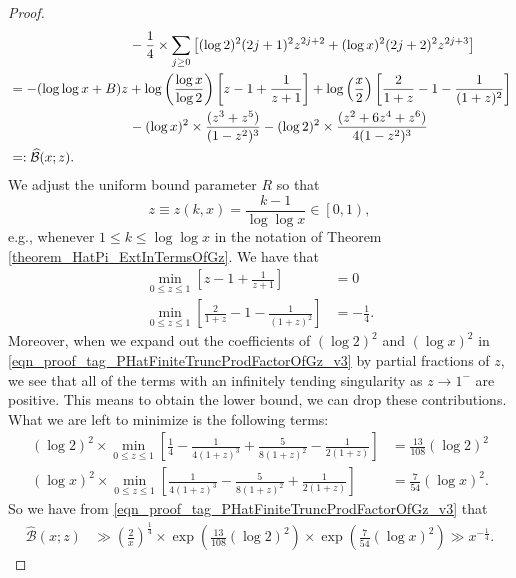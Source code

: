 \documentclass[11pt,reqno,a4letter]{article}
\numberwithin{figure}{section}
\numberwithin{table}{section}
\theoremstyle{plain}
\numberwithin{theorem}{section}
\theoremstyle{definition}
\begin{document}
\begin{proof}
\begin{align}
\notag 
     & \phantom{= -(B + \log\log x) z\ } - 
     \frac{1}{4} \times \sum_{j \geq 0} \left[ 
     (\log 2)^2 (2j+1)^2 z^{2j+2} + (\log x)^2 (2j+2)^2 z^{2j+3} 
     \right] \\ 
\notag 
     & = -(\log\log x + B) z + 
     \log\left(\frac{\log x}{\log 2}\right) \left[ 
     z - 1 + \frac{1}{z+1}\right] + 
     \log\left(\frac{x}{2}\right)\left[ 
     \frac{2}{1+z} - 1 - \frac{1}{(1+z)^2}\right] \\ 
\notag 
     & \phantom{= -(B + \log\log x) z\ } - 
     (\log x)^2 \times \frac{(z^3+z^5)}{(1-z^2)^3} - 
     (\log 2)^2 \times \frac{(z^2+6z^4+z^6)}{4 (1-z^2)^3} \\ 
\label{eqn_proof_tag_PHatFiniteTruncProdFactorOfGz_v3} 
     & =: \widehat{\mathcal{B}}(x; z). 
\end{align} 
We adjust the uniform bound parameter $R$ so that 
$$z \equiv z(k, x) = \frac{k-1}{\log\log x} \in \left[0, 1\right),$$ 
e.g., whenever $1 \leq k \leq \log\log x$ 
in the notation of Theorem \ref{theorem_HatPi_ExtInTermsOfGz}. 
We have that 
\begin{align*} 
\min_{0 \leq z \leq 1} \left[z - 1 + \frac{1}{z+1}\right] & = 0 \\ 
\min_{0 \leq z \leq 1} \left[\frac{2}{1+z} - 1 - \frac{1}{(1+z)^2}\right] & = -\frac{1}{4}. 
\end{align*} 
Moreover, when we expand out the coefficients of 
$(\log 2)^2$ and $(\log x)^2$ in 
\eqref{eqn_proof_tag_PHatFiniteTruncProdFactorOfGz_v3} 
by partial fractions of $z$, 
we see that all of the terms with an infinitely tending 
singularity as $z \rightarrow 1^{-}$ are positive. 
This means to obtain the lower bound, we can drop these contributions. 
What we are left to minimize is the following terms: 
\begin{align*} 
(\log 2)^2 \times \min_{0 \leq z \leq 1} \left[\frac{1}{4} - \frac{1}{4(1+z)^3} + 
     \frac{5}{8(1+z)^2} - \frac{1}{2(1+z)}\right] & = \frac{13}{108} (\log 2)^2 \\ 
(\log x)^2 \times \min_{0 \leq z \leq 1} \left[\frac{1}{4(1+z)^3} - 
     \frac{5}{8(1+z)^2} + \frac{1}{2(1+z)}\right] & = \frac{7}{54} (\log x)^2. 
\end{align*} 
So we have from \eqref{eqn_proof_tag_PHatFiniteTruncProdFactorOfGz_v3} that 
\begin{align*} 
\widehat{\mathcal{B}}(x; z) & \gg 
     \left(\frac{2}{x}\right)^{\frac{1}{4}} \times \exp\left( 
     \frac{13}{108} (\log 2)^2\right) \times \exp\left( 
     \frac{7}{54} (\log x)^2\right) \gg 
     x^{-\frac{1}{4}}. 

\end{align*}
\end{proof}
\end{document}
